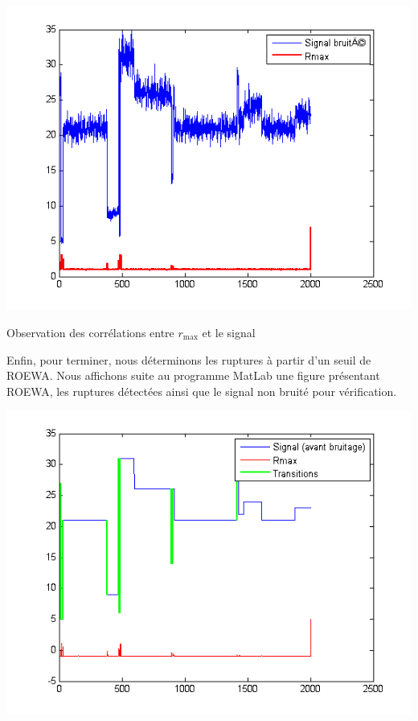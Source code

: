 \documentclass[a4paper,11pt]{article}
\newcommand{\FSource}[1]{%
  
  }
\begin{document}
\vspace{0.5cm}

\FSource{matlab/3-4.m}

\vspace{0.5cm}

\includegraphics[width=15cm]{capture3/partie3_06.png}
\begin{center}Observation des corrélations entre $r_\textrm{max}$ et le
signal\end{center}

Enfin, pour terminer, nous déterminons les ruptures à partir d'un seuil de ROEWA. Nous affichons suite au programme MatLab une figure présentant ROEWA, les ruptures détectées ainsi que le signal non bruité pour vérification.

\vspace{0.5cm}

\FSource{matlab/8.m}

\vspace{0.5cm}

\includegraphics[width=15cm]{capture3/partie3_07.png}
\end{document}
